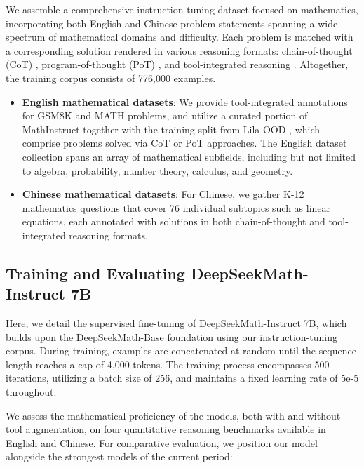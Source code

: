 We assemble a comprehensive instruction-tuning dataset focused on mathematics, incorporating both English and Chinese problem statements spanning a wide spectrum of mathematical domains and difficulty. Each problem is matched with a corresponding solution rendered in various reasoning formats: chain-of-thought (CoT) \citep{cot}, program-of-thought (PoT) \citep{pot,pal}, and tool-integrated reasoning \citep{tora}. Altogether, the training corpus consists of 776,000 examples.

\begin{itemize}[topsep=0pt]
    \item \textbf{English mathematical datasets}: We provide tool-integrated annotations for GSM8K and MATH problems, and utilize a curated portion of MathInstruct \citep{MathInstruct} together with the training split from Lila-OOD \citep{lila}, which comprise problems solved via CoT or PoT approaches. The English dataset collection spans an array of mathematical subfields, including but not limited to algebra, probability, number theory, calculus, and geometry.
    \item \textbf{Chinese mathematical datasets}: For Chinese, we gather K-12 mathematics questions that cover 76 individual subtopics such as linear equations, each annotated with solutions in both chain-of-thought and tool-integrated reasoning formats.
\end{itemize}

\subsection{Training and Evaluating DeepSeekMath-Instruct 7B}

Here, we detail the supervised fine-tuning of DeepSeekMath-Instruct 7B, which builds upon the DeepSeekMath-Base foundation using our instruction-tuning corpus. During training, examples are concatenated at random until the sequence length reaches a cap of 4,000 tokens. The training process encompasses 500 iterations, utilizing a batch size of 256, and maintains a fixed learning rate of 5e-5 throughout.

We assess the mathematical proficiency of the models, both with and without tool augmentation, on four quantitative reasoning benchmarks available in English and Chinese. For comparative evaluation, we position our model alongside the strongest models of the current period:

